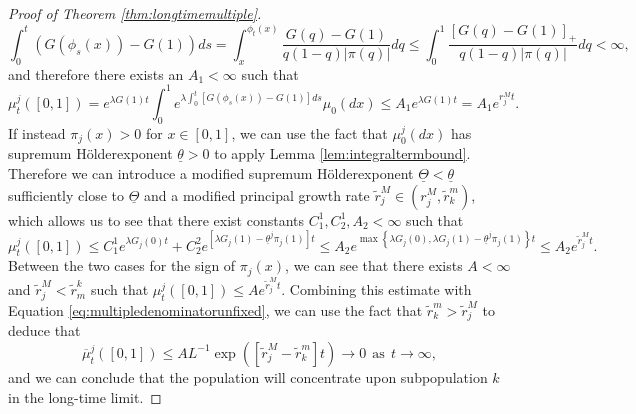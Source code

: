 \documentclass[11pt]{article}
\numberwithin{equation}{section}
\newcommand{\ol}{\overline}
\newcommand{\holder}{H{\"o}lder\:}
\begin{document}
{\begin{proof}[Proof of Theorem \ref{thm:longtimemultiple}]
\begin{equation}
    \int_0^t \left(G(\phi_s(x)) - G(1)\right) ds = \int_x^{\phi_t(x)} \frac{G(q) - G(1)}{q(1-q) |\pi(q)|} dq \leq \int_0^1 \frac{\left[G(q) - G(1)\right]_+}{q(1-q) |\pi(q)|} dq < \infty,
\end{equation}
and therefore there exists an $A_1 < \infty$ such that
\begin{equation}
    \mu_t^j([0,1]) = e^{\lambda G(1) t} \int_0^1 e^{\lambda \int_0^t \left[G(\phi_s(x)) - G(1)\right] ds} \mu_0(dx) \leq A_1 e^{\lambda G(1) t} = A_1 e^{r_j^M t}.
\end{equation}
If instead $\pi_j(x) > 0$ for $x \in [0,1]$, we can use the fact that $\mu_0^j(dx)$ has supremum \holder exponent $\underline{\theta} > 0$ to apply Lemma \ref{lem:integraltermbound}. Therefore we can introduce a modified supremum \holder exponent $\underline{\Theta} < \underline{\theta}$ sufficiently close to $\underline{\Theta}$ and a modified principal growth rate $\tilde{r}_j^M \in (r_j^M,\tilde{r}_k^m)$, which allows us to see that there exist constants $C_1^1,C_2^1,A_2 < \infty$ such that
\begin{equation} \label{eq:subdominantpopestimate}
\mu^j_t\left( \left[0,1\right] \right) \leq C_1^1 e^{\lambda G_j(0) t} + C_2^2 e^{\left[\lambda G_j(1) - \underline{\theta}^j \pi_j(1) \right] t} \leq A_2 e^{\max\left\{\lambda G_j(0),\lambda G_j(1) - \underline{\theta}^j \pi_j(1)\right\} t} \leq A_2 e^{\tilde{r}_j^M t}.
\end{equation}
Between the two cases for the sign of $\pi_j(x)$, we can see that there exists $A < \infty$ and $\tilde{r}_j^M < \tilde{r}^k_m$ such that $\mu^j_t\left( \left[0,1\right] \right) \leq A e^{\tilde{r}_j^M t}$. 
Combining this estimate with Equation \eqref{eq:multipledenominatorunfixed}, we can use the fact that $\tilde{r}_k^m  > \tilde{r}_j^M$ to deduce that
\begin{equation}
    \ol{\mu}_t^j\left([0,1]\right) \leq A L^{-1} \exp\left( \left[\tilde{r}_j^M - \tilde{r}_k^m \right] t \right) \to 0 \: \: \mathrm{as} \: \: t \to \infty,
\end{equation}
and we can conclude that the population will concentrate upon subpopulation $k$ in the long-time limit.


\end{proof}}
\end{document}
